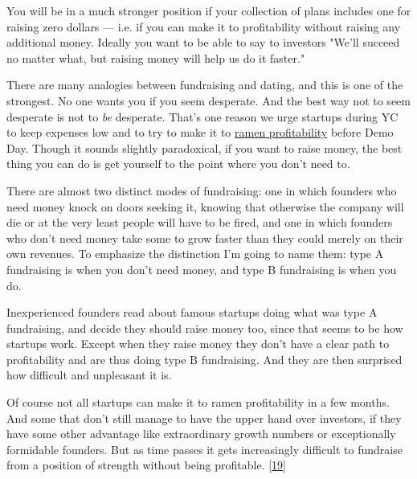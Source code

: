 You will be in a
                    much stronger position if your collection of plans includes
                    one for raising zero dollars --- i.e. if you can make it
                    to profitability without raising any additional money.
                    Ideally you want to be able to say to investors "We'll
                    succeed no matter what, but raising money will help us do it
                    faster."

There are many analogies between
                    fundraising and dating, and this is one of the strongest. No
                    one wants you if you seem desperate. And the best way not to
                    seem desperate is not to \emph{be} desperate. That's one
                    reason we urge startups during YC to keep expenses low and
                    to try to make it to
                    \href{http://www.paulgraham.com/ramenprofitable.html}{ramen profitability}
                    before Demo Day. Though it sounds slightly paradoxical, if
                    you want to raise money, the best thing you can do is get
                    yourself to the point where you don't need to.

There
                    are almost two distinct modes of fundraising: one in which
                    founders who need money knock on doors seeking it, knowing
                    that otherwise the company will die or at the very least
                    people will have to be fired, and one in which founders who
                    don't need money take some to grow faster than they could
                    merely on their own revenues. To emphasize the distinction
                    I'm going to name them: type A fundraising is when you don't
                    need money, and type B fundraising is when you do.

Inexperienced
                    founders read about famous startups doing what was type A
                    fundraising, and decide they should raise money too, since
                    that seems to be how startups work. Except when they raise
                    money they don't have a clear path to profitability and are
                    thus doing type B fundraising. And they are then surprised
                    how difficult and unpleasant it is.

Of course not
                    all startups can make it to ramen profitability in a few
                    months. And some that don't still manage to have the upper
                    hand over investors, if they have some other advantage like
                    extraordinary growth numbers or exceptionally formidable
                    founders. But as time passes it gets increasingly difficult
                    to fundraise from a position of strength without being
                    profitable.
                    [\href{\#f19n}{19}]


